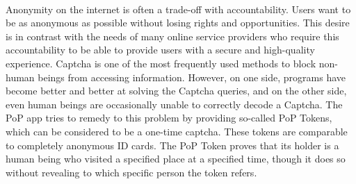 \paragraph{}
Anonymity on the internet is often a trade-off with accountability. Users want to be as anonymous as possible without losing rights and opportunities. This desire is in contrast with the needs of many online service providers who require this accountability to be able to provide users with a secure and high-quality experience. Captcha is one of the most frequently used methods to block non-human beings from accessing information. However, on one side, programs have become better and better at solving the Captcha queries, and on the other side, even human beings are occasionally unable to correctly decode a Captcha. The PoP app tries to remedy to this problem by providing so-called PoP Tokens, which can be considered to be a one-time captcha. These tokens are comparable to completely anonymous ID cards. The PoP Token proves that its holder is a human being who visited a specified place at a specified time, though it does so without revealing to which specific person the token refers.

